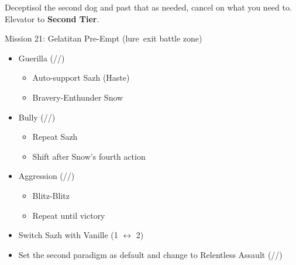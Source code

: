 \renewcommand{\first}{[1] Guerilla (\syn/\sab/\rav)}
\renewcommand{\second}{[2] Devastation (\com/\sab/\com)}
\renewcommand{\third}{[3] Hero's Charge (\syn/\med/\com)}
\renewcommand{\fourth}{[4] Tireless Charge (\com/\med/\com)}
\renewcommand{\fifth}{[5] Bully (\syn/\sab/\com)}
\renewcommand{\sixth}{[6] Aggression (\com/\rav/\com)}

	Deceptisol the second dog and past that as needed, cancel on what you need to.
	Elevator to \textbf{Second Tier}.
	\vfill
	\ 
	\begin{battle}[0:37]{Mission 21: Gelatitan Pre-Empt (lure\, exit battle zone)}
		\begin{itemize}
			\item \first
			      \begin{itemize}
				      \item Auto-support Sazh (Haste)
				      \item Bravery-Enthunder Snow
			      \end{itemize}
			\item \fifth
			      \begin{itemize}
				      \item Repeat Sazh
				      \item Shift after Snow's fourth action
			      \end{itemize}
			\item \sixth
			      \begin{itemize}
				      \item Blitz-Blitz
				      \item Repeat until victory
			      \end{itemize}
		\end{itemize}
	\end{battle}
	\begin{menu}
		\begin{itemize}
			\paradigm
			\begin{itemize}
				\item Switch Sazh with Vanille (1 $\leftrightarrow$ 2)
				\item Set the second paradigm as default and change to Relentless Assault (\rav/\com/\rav)
			\end{itemize}
		\end{itemize}
	\end{menu}
	\renewcommand{\second}{[2]Relentless Assault (\rav/\com/\rav)}
	

